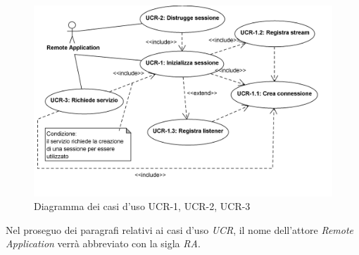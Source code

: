 
\begin{figure}
\centering
\includegraphics[width=1.1\textwidth]{Immagini/Capitolo2/UseCases/UCR-generale.png}
\caption{Diagramma dei casi d'uso UCR-1, UCR-2, UCR-3}\label{fig:uc-ucr-generale}
\end{figure}

Nel proseguo dei paragrafi relativi ai casi d'uso \emph{UCR}, il nome dell'attore \emph{Remote Application} verrà abbreviato con la sigla \emph{RA}.

